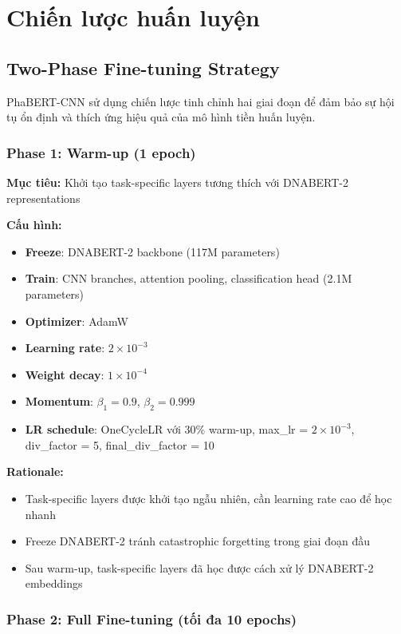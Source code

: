 \section{Chiến lược huấn luyện}
\label{sec:training}

\subsection{Two-Phase Fine-tuning Strategy}

PhaBERT-CNN sử dụng chiến lược tinh chỉnh hai giai đoạn để đảm bảo sự hội tụ ổn định và thích ứng hiệu quả của mô hình tiền huấn luyện.

\subsubsection{Phase 1: Warm-up (1 epoch)}

\textbf{Mục tiêu:} Khởi tạo task-specific layers tương thích với DNABERT-2 representations

\textbf{Cấu hình:}
\begin{itemize}
    \item \textbf{Freeze}: DNABERT-2 backbone (117M parameters)
    \item \textbf{Train}: CNN branches, attention pooling, classification head (2.1M parameters)
    \item \textbf{Optimizer}: AdamW
    \item \textbf{Learning rate}: $2 \times 10^{-3}$
    \item \textbf{Weight decay}: $1 \times 10^{-4}$
    \item \textbf{Momentum}: $\beta_1 = 0.9$, $\beta_2 = 0.999$
    \item \textbf{LR schedule}: OneCycleLR với 30\% warm-up, max\_lr = $2 \times 10^{-3}$, div\_factor = 5, final\_div\_factor = 10
\end{itemize}

\textbf{Rationale:}
\begin{itemize}
    \item Task-specific layers được khởi tạo ngẫu nhiên, cần learning rate cao để học nhanh
    \item Freeze DNABERT-2 tránh catastrophic forgetting trong giai đoạn đầu
    \item Sau warm-up, task-specific layers đã học được cách xử lý DNABERT-2 embeddings
\end{itemize}

\subsubsection{Phase 2: Full Fine-tuning (tối đa 10 epochs)}

